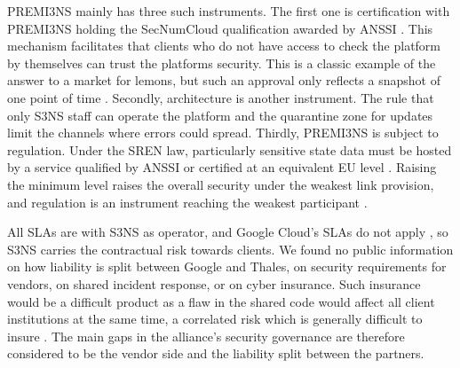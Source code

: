 PREMI3NS mainly has three such instruments. The first one is certification with PREMI3NS holding the SecNumCloud qualification awarded by ANSSI \parencite{s3ns2025premi3ns}. This mechanism facilitates that clients who do not have access to check the platform by themselves can trust the platforms security. This is a classic example of the answer to a market for lemons, but such an approval only reflects a snapshot of one point of time \parencite[slide 31]{kianpour2026slides}. Secondly, architecture is another instrument. The rule that only S3NS staff can operate the platform and the quarantine zone for updates \parencite{s3ns2025premi3ns} limit the channels where errors could spread. Thirdly, PREMI3NS is subject to regulation. Under the SREN law, particularly sensitive state data must be hosted by a service qualified by ANSSI or certified at an equivalent EU level \parencite{decretsren2026}. Raising the minimum level raises the overall security under the weakest link provision, and regulation is an instrument reaching the weakest participant \parencite[slide 30]{kianpour2026slides}.

All SLAs are with S3NS as operator, and Google Cloud's SLAs do not apply \parencite{s3nsdocs_keydiff}, so S3NS carries the contractual risk towards clients. We found no public information on how liability is split between Google and Thales, on security requirements for vendors, on shared incident response, or on cyber insurance. Such insurance would be a difficult product as a flaw in the shared code would affect all client institutions at the same time, a correlated risk which is generally difficult to insure \parencite[p.~612]{andersonmoore2006}. The main gaps in the alliance's security governance are therefore considered to be the vendor side and the liability split between the partners.